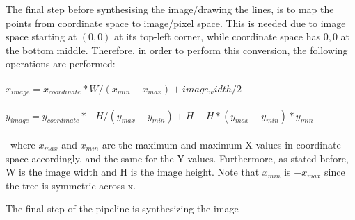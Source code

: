The final step before synthesising the image/drawing the lines, is to map the points from coordinate space to image/pixel space. This is needed due to image space starting at $(0, 0)$ at its top-left corner, while coordinate space has $0,0$ at the bottom middle. Therefore, in order to perform this conversion, the following operations are performed: 
\\ \\
$x_{image} = x_{coordinate} * W / (x_{min} - x_{max}) + image_width/2$
\\ \\
$y_{image} = y_{coordinate} * - H / (y_{max} - y_{min}) + H - H*(y_{max}-y_{min}) * y_{min}$
\\ \\\
where $x_{max}$ and $x_{min}$ are the maximum and maximum X values in coordinate space accordingly, and the same for the Y values. Furthermore, as stated before, W is the image width and H is the image height. Note that $x_{min}$ is $-x_{max}$ since the tree is symmetric across x.

The final step of the pipeline is synthesizing the image